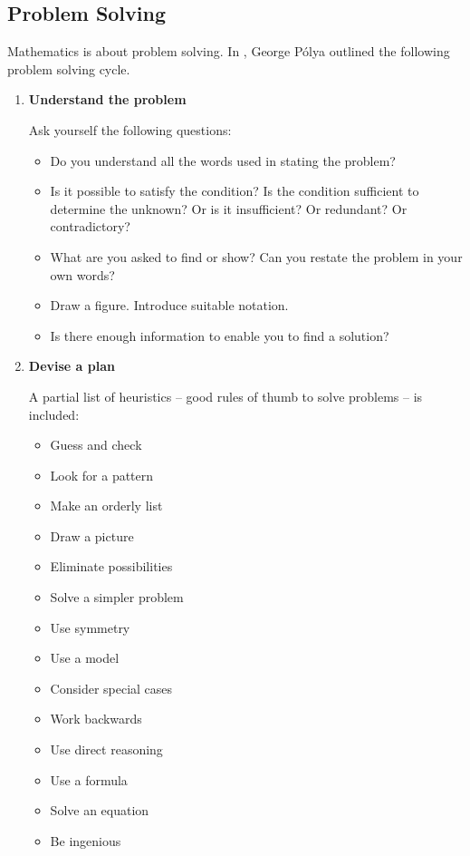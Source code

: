\subsection*{Problem Solving}
Mathematics is about problem solving. In \cite{polya}, George P\'{o}lya outlined the following problem solving cycle.
\begin{enumerate}
\item \textbf{Understand the problem}

Ask yourself the following questions:
\begin{itemize}
\item Do you understand all the words used in stating the problem?
\item Is it possible to satisfy the condition? Is the condition sufficient to determine the unknown? Or is it insufficient? Or redundant? Or contradictory?
\item What are you asked to find or show? Can you restate the problem in your own words?
\item Draw a figure. Introduce suitable notation.
\item Is there enough information to enable you to find a solution?
\end{itemize}

\item \textbf{Devise a plan}

A partial list of heuristics -- good rules of thumb to solve problems -- is included:
\begin{multicols}{2}
\begin{itemize}
\item Guess and check
\item Look for a pattern
\item Make an orderly list
\item Draw a picture
\item Eliminate possibilities
\item Solve a simpler problem
\item Use symmetry
\item Use a model
\item Consider special cases
\item Work backwards
\item Use direct reasoning
\item Use a formula
\item Solve an equation
\item Be ingenious
\end{itemize}
\end{multicols}


\end{enumerate}
